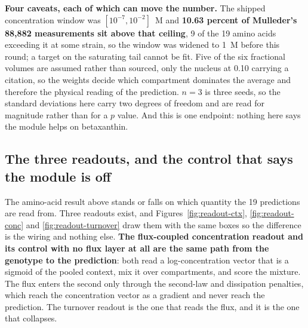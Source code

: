 \textbf{Four caveats, each of which can move the number.} The shipped concentration window
was $[10^{-7}, 10^{-2}]$~M and \textbf{10.63 percent of Mulleder's 88{,}882 measurements sit
above that ceiling}, 9 of the 19 amino acids exceeding it at some strain, so the window was
widened to 1~M before this round; a target on the saturating tail cannot be fit. Five of the
six fractional volumes are assumed rather than sourced, only the nucleus at 0.10 carrying a
citation, so the weights decide which compartment dominates the average and therefore the
physical reading of the prediction. $n = 3$ is three seeds, so the standard deviations here
carry two degrees of freedom and are read for magnitude rather than for a $p$ value. And
this is one endpoint: nothing here says the module helps on betaxanthin.

\subsection{The three readouts, and the control that says the module is off}
\label{sec:aa-readouts}

The amino-acid result above stands or falls on which quantity the 19 predictions are read
from. Three readouts exist, and Figures~\ref{fig:readout-ctx}, \ref{fig:readout-conc} and
\ref{fig:readout-turnover} draw them with the same boxes so the difference is the wiring
and nothing else. \textbf{The flux-coupled concentration readout and its control with no
flux layer at all are the same path from the genotype to the prediction}: both read a
log-concentration vector that is a sigmoid of the pooled context, mix it over compartments,
and score the mixture. The flux enters the second only through the second-law and
dissipation penalties, which reach the concentration vector as a gradient and never reach
the prediction. The turnover readout is the one that reads the flux, and it is the one that
collapses.


